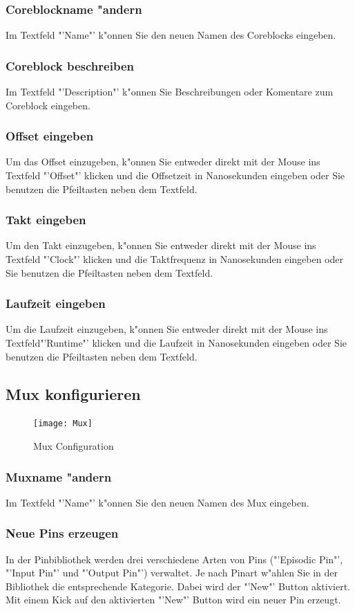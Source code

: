 \documentclass[a4paper,titlepage,12pt,ngerman]{scrbook}
\begin{document}
\subsubsection{Coreblockname "andern}
Im Textfeld "'Name"' k"onnen Sie den neuen Namen des Coreblocks eingeben.
\subsubsection{Coreblock beschreiben}
Im Textfeld "'Description"' k"onnen Sie Beschreibungen oder Komentare zum Coreblock eingeben.
\subsubsection{Offset eingeben}
Um das Offset einzugeben, k"onnen Sie entweder direkt mit der Mouse ins Textfeld "'Offset"' klicken und die Offsetzeit in Nanosekunden eingeben oder Sie benutzen die Pfeiltasten neben dem Textfeld. 
\subsubsection{Takt eingeben}
Um den Takt einzugeben, k"onnen Sie entweder direkt mit der Mouse ins Textfeld "'Clock"' klicken und die Taktfrequenz in Nanosekunden eingeben oder Sie benutzen die Pfeiltasten neben dem Textfeld. 
\subsubsection{Laufzeit eingeben}
Um die Laufzeit einzugeben, k"onnen Sie entweder direkt mit der Mouse ins Textfeld"'Runtime"' klicken und die Laufzeit in Nanosekunden eingeben oder Sie benutzen die Pfeiltasten neben dem Textfeld. 




\subsection{Mux konfigurieren}
\begin{figure}[htbp]
\begin{center}
\texttt{[image: Mux]}
\caption{Mux Configuration}\label{test}
\end{center}
\end{figure}
\subsubsection{Muxname "andern}
Im Textfeld "'Name"' k"onnen Sie den neuen Namen des Mux eingeben.
\subsubsection{Neue Pins erzeugen}
In der Pinbibliothek werden drei verschiedene Arten von Pins ("'Episodic Pin"', "'Input Pin"' und "'Output Pin"') verwaltet. Je nach Pinart w"ahlen Sie in der Bibliothek die entsprechende Kategorie. Dabei wird der "'New"' Button aktiviert. Mit einem Kick auf den aktivierten "'New"' Button wird ein neuer Pin erzeugt. \par
\end{document}
